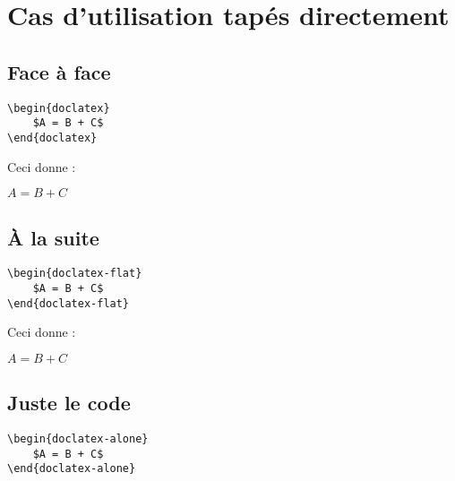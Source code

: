 \section{Cas d'utilisation tapés directement}

\subsection{Face à face}

\begin{tcolorbox}  %
\begin{verbatim}
\begin{doclatex}
	$A = B + C$
\end{doclatex}
\end{verbatim}
\end{tcolorbox}    %

Ceci donne :

\begin{doclatex}
	$A = B + C$
\end{doclatex}




\subsection{À la suite}

\begin{tcolorbox}  %
\begin{verbatim}
\begin{doclatex-flat}
	$A = B + C$
\end{doclatex-flat}
\end{verbatim}
\end{tcolorbox}    %

Ceci donne :

\begin{doclatex-flat}
	$A = B + C$
\end{doclatex-flat}




\subsection{Juste le code}

\begin{tcolorbox}  %
\begin{verbatim}
\begin{doclatex-alone}
	$A = B + C$
\end{doclatex-alone}
\end{verbatim}
\end{tcolorbox}    %

